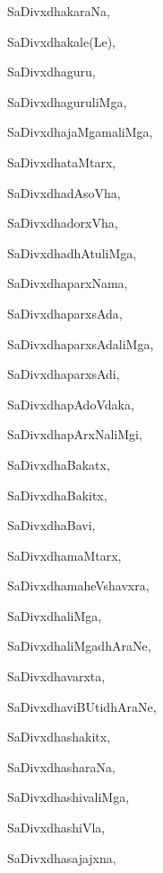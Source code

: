 \begin{multicols}{2}
{SaDivxdhakaraNa}, \pageref{SaDivxdhakaraNa}

{SaDivxdhakale(Le)}, \pageref{SaDivxdhakaleLe}

{SaDivxdhaguru}, \pageref{SaDivxdhaguru}

{SaDivxdhaguruliMga}, \pageref{SaDivxdhaguruliMga}

{SaDivxdhajaMgamaliMga}, \pageref{SaDivxdhajaMgamaliMga}

{SaDivxdhataMtarx}, \pageref{SaDivxdhataMtarx}

{SaDivxdhadAsoVha}, \pageref{SaDivxdhadAsoVha}

{SaDivxdhadorxVha}, \pageref{SaDivxdhadorxVha}

{SaDivxdhadhAtuliMga}, \pageref{SaDivxdhadhAtuliMga}

{SaDivxdhaparxNama}, \pageref{SaDivxdhaparxNama}

{SaDivxdhaparxsAda}, \pageref{SaDivxdhaparxsAda}

{SaDivxdhaparxsAdaliMga}, \pageref{SaDivxdhaparxsAdaliMga}

{SaDivxdhaparxsAdi}, \pageref{SaDivxdhaparxsAdi}

{SaDivxdhapAdoVdaka}, \pageref{SaDivxdhapAdoVdaka}

{SaDivxdhapArxNaliMgi}, \pageref{SaDivxdhapArxNaliMgi}

{SaDivxdhaBakatx}, \pageref{SaDivxdhaBakatx}

{SaDivxdhaBakitx}, \pageref{SaDivxdhaBakitx}

{SaDivxdhaBavi}, \pageref{SaDivxdhaBavi}

{SaDivxdhamaMtarx}, \pageref{SaDivxdhamaMtarx}

{SaDivxdhamaheVshavxra}, \pageref{SaDivxdhamaheVshavxra}

{SaDivxdhaliMga}, \pageref{SaDivxdhaliMga}

{SaDivxdhaliMgadhAraNe}, \pageref{SaDivxdhaliMgadhAraNe}

{SaDivxdhavarxta}, \pageref{SaDivxdhavarxta}

{SaDivxdhaviBUtidhAraNe}, \pageref{SaDivxdhaviBUtidhAraNe}

{SaDivxdhashakitx}, \pageref{SaDivxdhashakitx}

{SaDivxdhasharaNa}, \pageref{SaDivxdhasharaNa}

{SaDivxdhashivaliMga}, \pageref{SaDivxdhashivaliMga}

{SaDivxdhashiVla}, \pageref{SaDivxdhashiVla}

{SaDivxdhasajajxna}, \pageref{SaDivxdhasajajxna}


\end{multicols}
